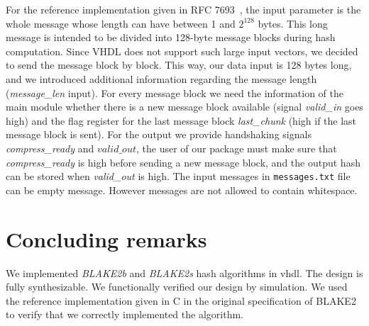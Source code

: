 \documentclass[%
	a4paper,
]
{article}
\newcommand{\todo}[1]{\textcolor{red}{#1}}
\newcommand{\done}[1]{}
\begin{document}
For the reference implementation given in RFC 7693~\autocite{rfc7693},
the input parameter is the whole message whose length can have between 1
and $2^{128}$ bytes.
%
This long message is intended to be divided into 128-byte message blocks
during hash computation. Since VHDL does not support such large input
vectors, we decided to send the message block by block.
%
This way, our data input is 128 bytes long, and we introduced additional
information regarding the message length (\emph{message_len} input).
%
%
For every message block we need the information of the main module whether there
is a new message block available (signal \emph{valid_in} goes high) and the flag
register for the last message block \emph{last_chunk} (high if the last message
block is sent).
%
For the output we provide handshaking signals \emph{compress_ready}
and $valid\_out$, the user of our package must make sure that
\emph{compress_ready} is high before sending a new message block, and the
output hash can be stored when \emph{valid_out} is high.
%
The input messages in \texttt{messages.txt} file can be empty message. However
messages are not allowed to contain whitespace. \done{Why not? This is a very
strong constraint! We should definitely allow whitespace.}
%
%
\section{Concluding remarks}
\label{sec:conclusding-remarks}

We implemented \emph{BLAKE2b} and \emph{BLAKE2s} hash algorithms in \gls{vhdl}.
The design is fully synthesizable. We functionally verified our design by
simulation. We used the reference implementation given in C in the original
specification of BLAKE2~\autocite{rfc7693} to verify that we correctly
implemented the algorithm. 
%
%
%
\printbibliography
%
%
\end{document}
